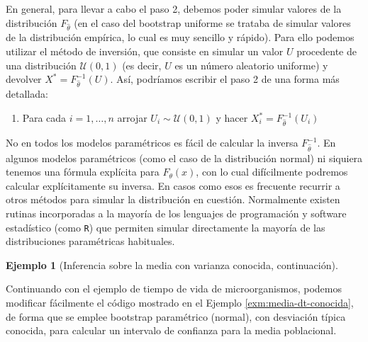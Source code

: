 \documentclass[
]{book}
\providecommand{\tightlist}{%
  \setlength{\itemsep}{0pt}\setlength{\parskip}{0pt}}
\theoremstyle{break}
\theoremstyle{definition}
\theoremstyle{definition}
\newtheorem{example}{Ejemplo}[chapter]
\theoremstyle{definition}
\theoremstyle{remark}
\begin{document}
En general, para llevar a cabo el paso 2, debemos poder simular valores
de la distribución \(F_{\hat{\theta}}\) (en el caso del bootstrap uniforme
se trataba de simular valores de la distribución empírica, lo cual es
muy sencillo y rápido). Para ello podemos utilizar el método de
inversión, que consiste en simular un valor \(U\) procedente de una
distribución \(\mathcal{U}\left( 0,1 \right)\) (es decir, \(U\) es un número aleatorio
uniforme) y devolver \(X^{\ast}=F_{\hat{\theta}}^{-1}\left( U \right)\). Así, podríamos escribir el paso 2 de una forma más
detallada:

\begin{enumerate}
\def\labelenumi{\arabic{enumi}.}
\setcounter{enumi}{1}
\tightlist
\item
  Para cada \(i=1,\ldots ,n\) arrojar \(U_i\sim \mathcal{U}\left( 0,1 \right)\) y
  hacer \(X_i^{\ast}=F_{\hat{\theta}}^{-1}\left( U_i \right)\)
\end{enumerate}

No en todos los modelos paramétricos es fácil de calcular la inversa
\(F_{\hat{\theta}}^{-1}\). En algunos modelos paramétricos (como el caso
de la distribución normal) ni siquiera tenemos una fórmula explícita
para \(F_{\theta }\left( x \right)\), con lo cual difícilmente podremos
calcular explícitamente su inversa. En casos como esos es frecuente
recurrir a otros métodos para simular la distribución en cuestión.
Normalmente existen rutinas incorporadas a la mayoría de los lenguajes
de programación y software estadístico (como \texttt{R}) que permiten simular
directamente la mayoría de las distribuciones paramétricas habituales.

\begin{example}[Inferencia sobre la media con varianza conocida, continuación]
\protect\hypertarget{exm:media-dt-conocida-par}{}{\label{exm:media-dt-conocida-par} \iffalse (Inferencia sobre la media con varianza conocida, continuación) \fi{} }
\end{example}
Continuando con el ejemplo de tiempo de vida de microorganismos,
podemos modificar fácilmente el código mostrado en el Ejemplo \ref{exm:media-dt-conocida}, de forma que se emplee bootstrap
paramétrico (normal), con desviación típica conocida, para
calcular un intervalo de confianza para la media poblacional.
\end{document}
